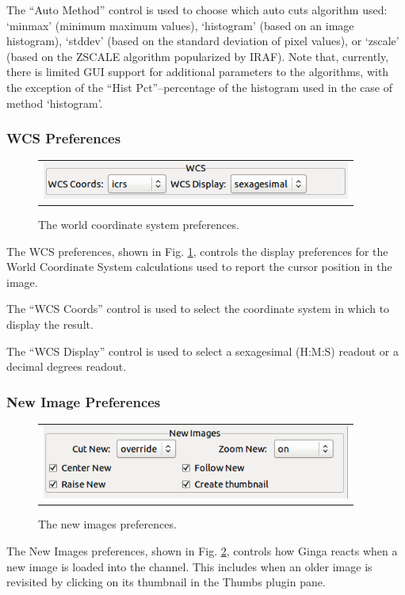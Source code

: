 \documentclass[11pt]{report}
\begin{document}
The ``Auto Method'' control is used to choose which auto cuts algorithm
used: `minmax' (minimum maximum values), `histogram' (based on an image
histogram), `stddev' (based on the standard deviation of pixel values), or 
`zscale' (based on the ZSCALE algorithm popularized by IRAF).  Note that,
currently, there is limited GUI support for additional parameters to the
algorithms, with the exception of the ``Hist Pct''--percentage of the
histogram used in the case of method `histogram'.

\subsubsection{WCS Preferences}
\begin{figure}
  \begin{center}
    \begin{tabular}{c}
      \includegraphics[width=4in]{wcs-prefs.png}
    \end{tabular}
  \end{center}
  \caption[example] 
          { \label{fig:prefs-wcs} 
            The world coordinate system preferences.} 
\end{figure} 
The WCS preferences, shown in Fig. \ref{fig:prefs-wcs}, controls the
display preferences for the World Coordinate System calculations used to
report the cursor position in the image.

The ``WCS Coords'' control is used to select the coordinate system in
which to display the result.

The ``WCS Display'' control is used to select a sexagesimal (H:M:S)
readout or a decimal degrees readout.

\subsubsection{New Image Preferences}
\begin{figure}
  \begin{center}
    \begin{tabular}{c}
      \includegraphics[width=4in]{newimages-prefs.png}
    \end{tabular}
  \end{center}
  \caption[example] 
          { \label{fig:prefs-newimages} 
            The new images preferences.} 
\end{figure} 
The New Images preferences, shown in Fig. \ref{fig:prefs-newimages},
controls how Ginga reacts when a new image is loaded into the channel.
This includes when an older image is revisited by clicking on its
thumbnail in the Thumbs plugin pane.
\end{document}
